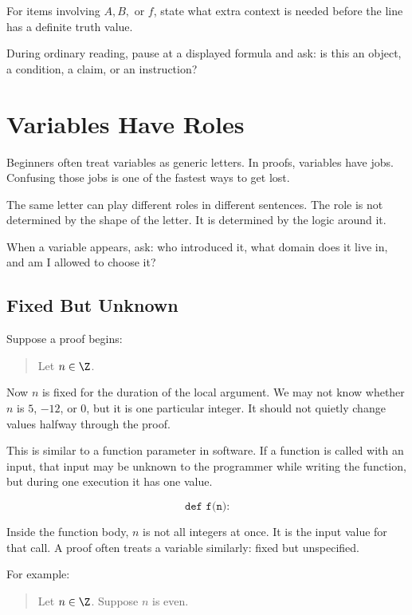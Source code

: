 For items involving $A,B,$ or $f$, state what extra context is needed before the line has a definite truth value.

\begin{walkbox}
During ordinary reading, pause at a displayed formula and ask: is this an object, a condition, a claim, or an instruction?
\end{walkbox}

\section{Variables Have Roles}

Beginners often treat variables as generic letters. In proofs, variables have jobs. Confusing those jobs is one of the fastest ways to get lost.

The same letter can play different roles in different sentences. The role is not determined by the shape of the letter. It is determined by the logic around it.

\begin{focusbox}
When a variable appears, ask: who introduced it, what domain does it live in, and am I allowed to choose it?
\end{focusbox}

\subsection{Fixed But Unknown}

Suppose a proof begins:

\begin{quote}
Let $n\in\Z$.
\end{quote}

Now $n$ is fixed for the duration of the local argument. We may not know whether $n$ is $5$, $-12$, or $0$, but it is one particular integer. It should not quietly change values halfway through the proof.

This is similar to a function parameter in software. If a function is called with an input, that input may be unknown to the programmer while writing the function, but during one execution it has one value.

\[
\texttt{def f(n):}
\]

Inside the function body, $n$ is not all integers at once. It is the input value for that call. A proof often treats a variable similarly: fixed but unspecified.

For example:

\begin{quote}
Let $n\in\Z$. Suppose $n$ is even.
\end{quote}

